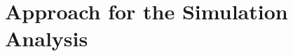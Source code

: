\documentclass[12pt]{article}
\begin{document}
				
%	
%		
%		
		



\section{Approach for the Simulation Analysis}\label{section_simulations}
\end{document}
